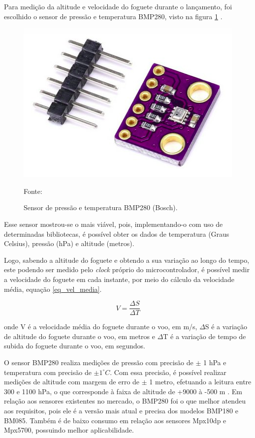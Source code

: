 Para medição da altitude e velocidade do foguete durante o lançamento, foi escolhido o sensor de pressão e temperatura BMP280, visto na figura \ref{fig:sensor_pressao} \cite{datasheet_BMP280}.

\begin{figure}[H]
  \centering
  \includegraphics[scale=0.75]{figuras/BMP280.png}
  \caption{Sensor de pressão e temperatura BMP280 (Bosch). }
 { \footnotesize Fonte:\cite{figura_BMP280}} 
  \label{fig:sensor_pressao}
\end{figure}

Esse sensor mostrou-se o mais viável, pois, implementando-o com uso de determinadas bibliotecas, é possível obter os dados de temperatura (Graus Celsius), pressão (hPa) e altitude (metros).

Logo, sabendo a altitude do foguete e obtendo a sua variação ao longo do tempo, este podendo ser medido pelo  \textit{clock} próprio do microcontrolador, é possível medir a velocidade do foguete em cada instante, por meio do cálculo da velocidade média, equação \ref{eq_vel_media}.

\begin{center}
\begin{equation}
\label{eq_vel_media}
V = \frac{\Delta S} {\Delta T}
\end{equation}
\end{center}

onde V é a velocidade média do foguete durante o voo, em m/s, $\Delta$S é a variação de altitude do foguete durante o voo, em metros e $\Delta$T é a variação de tempo de subida do foguete durante o voo, em segundos.

O sensor BMP280 realiza medições de pressão com precisão de $\pm$ 1 hPa e temperatura com precisão de $\pm 1 ^\circ C $. Com essa precisão, é possível realizar medições de altitude com margem de erro de  $\pm$ 1 metro, efetuando a leitura entre 300 e 1100 hPa, o que corresponde à faixa de altitude de +9000 à -500 m \cite{cia_BMP280_2017}.
Em relação aos sensores existentes no mercado, o BMP280 foi o que melhor atendeu aos requisitos, pois ele é a versão mais atual e precisa dos modelos BMP180 e BM085. Também é de baixo consumo em relação aos sensores Mpx10dp e Mpx5700, possuindo melhor aplicabilidade.

